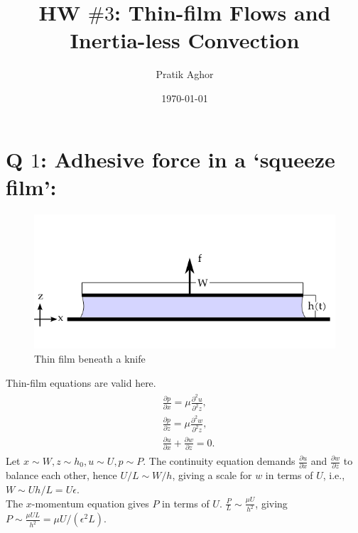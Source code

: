 \documentclass{article}
\author{Pratik Aghor}
\title{HW $\# 3$: Thin-film Flows and Inertia-less Convection}
\date{\today}  %
\begin{document}
\maketitle
\section{Q $1$: Adhesive force in a ‘squeeze film’:}
\begin{figure}[H]
    \centering
    \includegraphics[scale = 0.5]{Figs/thin_film_knife.png}
    \caption{Thin film beneath a knife}
    \label{fig:thin_film_knife}
\end{figure}

Thin-film equations are valid here.
\begin{align}\label{eq:thin_film_dim}
 \begin{split}
  & \frac{\partial p}{\partial x} = \mu\frac{\partial^{2}u}{\partial^{2}z},\\
  & \frac{\partial p}{\partial z} = \mu\frac{\partial^{2}w}{\partial^{2}z},\\
  & \frac{\partial u}{\partial x} + \frac{\partial w}{\partial z} = 0.
 \end{split}
\end{align}
Let $x\sim W, z \sim h_{0}, u \sim U, p \sim P$. The continuity equation demands $\frac{\partial u}{\partial x}$ and $\frac{\partial w}{\partial z}$ to balance each other, hence $U/L \sim W/h$, giving a scale for $w$ in terms of $U$, i.e., $W \sim Uh/L = U\epsilon$.\\
The $x$-momentum equation gives $P$ in terms of $U$. 
$\frac{P}{L} \sim \frac{\mu U}{h^{2}}$, giving $P \sim \frac{\mu U L}{h^{2}} = \mu U/(\epsilon^{2}L)$.
\end{document}

